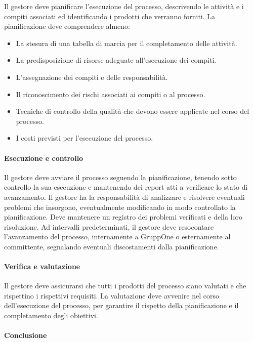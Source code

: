 \documentclass[../../norme-di-progetto.tex]{subfiles}
\begin{document}
Il gestore deve pianificare l'esecuzione del processo, descrivendo le attività e i compiti associati ed identificando i prodotti che verranno forniti.
La pianificazione deve comprendere almeno:
\begin{itemize}
  \item La stesura di una tabella di marcia per il completamento delle attività.
  \item La predisposizione di risorse adeguate all'esecuzione dei compiti.
  \item L'assegnazione dei compiti e delle responsabilità.
  \item Il riconoscimento dei rischi associati ai compiti o al processo.
  \item Tecniche di controllo della qualità che devono essere applicate nel corso del processo.
  \item I costi previsti per l'esecuzione del processo.
\end{itemize}

\paragraph{Esecuzione e controllo}%
\label{par:esecuzione_e_controllo}

Il gestore deve avviare il processo seguendo la pianificazione, tenendo sotto controllo la sua esecuzione e mantenendo dei report atti a verificare lo stato di avanzamento.
Il gestore ha la responsabilità di analizzare e risolvere eventuali problemi che insorgono, eventualmente modificando in modo controllato la pianificazione.
Deve mantenere un registro dei problemi verificati e della loro risoluzione.
Ad intervalli predeterminati, il gestore deve resocontare l'avanzamento del processo, internamente a GruppOne o esternamente al committente, segnalando eventuali discostamenti dalla pianificazione.

\paragraph{Verifica e valutazione}%
\label{par:verifica_e_valutazione}

Il gestore deve assicurarsi che tutti i prodotti del processo siano valutati e che rispettino i rispettivi requisiti.
La valutazione deve avvenire nel corso dell'esecuzione del processo, per garantire il rispetto della pianificazione e il completamento degli obiettivi.

\paragraph{Conclusione}%
\label{par:conclusione}
\end{document}
